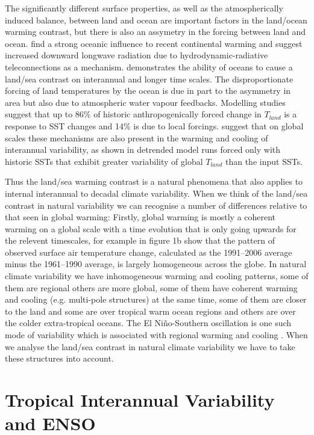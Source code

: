 The significantly different surface properties, as well as the atmospherically 
induced balance, between land and ocean are important factors in the land/ocean 
warming contrast, but there is also an assymetry in the forcing between land and 
ocean.  \citet{Compo2008} find a strong oceanic influence to recent continental 
warming and suggest increased downward longwave radiation due to 
hydrodynamic-radiative teleconnections as a mechanism.  \citet{Dommenget2009} 
demonstrates the ability of oceans to cause a land/sea contrast on interannual 
and longer time scales.  The disproportionate forcing of land temperatures by 
the ocean is due in part to the asymmetry in area but also due to atmospheric 
water vapour feedbacks.  Modelling studies suggest that up to 86\% of historic 
anthropogenically forced change in $T_{land}$ is a response to SST changes and 
14\% is due to local forcings. \citet{Dommenget2009} suggest that on global 
scales these mechanisms are also present in the warming and cooling of 
interannual variability, as shown in detrended model runs forced only with 
historic SSTs that exhibit greater variability of global $T_{land}$ than the 
input SSTs.

Thus the land/sea warming contrast is a natural phenomena that also applies to 
internal interannual to decadal climate variability.  When we think of the 
land/sea contrast in natural variability we can recognise a number of 
differences relative to that seen in global warming: Firstly, global warming is 
mostly a coherent warming on a global scale with a time evolution that is only 
going upwards for the relevent timescales, for example \citet{Compo2008} in 
figure 1b show that the pattern of observed surface air temperature change, 
calculated as the 1991--2006 average minus the 1961--1990 average, is largely 
homogeneous across the globe. In natural climate variability we have 
inhomogeneous warming and cooling patterns, some of them are regional others are 
more global, some of them have coherent warming and cooling (e.g.  multi-pole 
structures) at the same time, some of them are closer to the land and some are 
over tropical warm ocean regions and others are over the colder extra-tropical 
oceans. The El Ni{\~n}o-Southern oscillation is one such mode of variability 
which is associated with regional warming and cooling \citep{Halpert1992}. When 
we analyse the land/sea contrast in natural climate variability we have to take 
these structures into account.

\section{Tropical Interannual Variability and ENSO}

